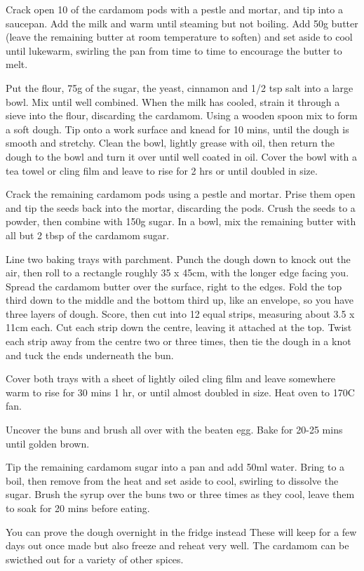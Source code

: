 \begin{method}
  	Crack open 10 of the cardamom pods with a pestle and mortar, and tip into a saucepan. Add the milk
and warm until steaming but not boiling. Add 50g butter (leave the remaining butter at room
temperature to soften) and set aside to cool until lukewarm, swirling the pan from time to time to
encourage the butter to melt.

Put the flour, 75g of the sugar, the yeast, cinnamon and 1/2 tsp salt into a large bowl. Mix until well
combined. When the milk has cooled, strain it through a sieve into the flour, discarding the cardamom.
Using a wooden spoon mix to form a soft dough. Tip onto a work surface and knead for 10 mins, until
the dough is smooth and stretchy. Clean the bowl, lightly grease with oil, then return the dough to the
bowl and turn it over until well coated in oil. Cover the bowl with a tea towel or cling film and leave to
rise for 2 hrs or until doubled in size.

Crack the remaining cardamom pods using a pestle and mortar. Prise them open and tip the seeds back
into the mortar, discarding the pods. Crush the seeds to a powder, then combine with 150g sugar. In a
bowl, mix the remaining butter with all but 2 tbsp of the cardamom sugar.

Line two baking trays with parchment. Punch the dough down to knock out the air, then roll to a
rectangle roughly 35 x 45cm, with the longer edge facing you. Spread the cardamom butter over the
surface, right to the edges. Fold the top third down to the middle and the bottom third up, like an
envelope, so you have three layers of dough. Score, then cut into 12 equal strips, measuring about 3.5 x
11cm each. Cut each strip down the centre, leaving it attached at the top. Twist each strip away from the
centre two or three times, then tie the dough in a knot and tuck the ends underneath the bun.

Cover both trays with a sheet of lightly oiled cling film and leave somewhere warm to rise for 30 mins 
1 hr, or until almost doubled in size. Heat oven to 170C fan.

Uncover the buns and brush all over with the beaten egg. Bake for 20-25 mins until golden brown.

Tip the remaining cardamom sugar into a pan and add 50ml water. Bring to a boil, then remove from the
heat and set aside to cool, swirling to dissolve the sugar. Brush the syrup over the buns two or three
times as they cool, leave them to soak for 20 mins before eating.
  
\end{method}




\begin{notes}
You can prove the dough overnight in the
fridge instead
 These will keep for a few days out once
made but also freeze and reheat very well.
 The cardamom can be swicthed out for a
variety of other spices.
\end{notes}

